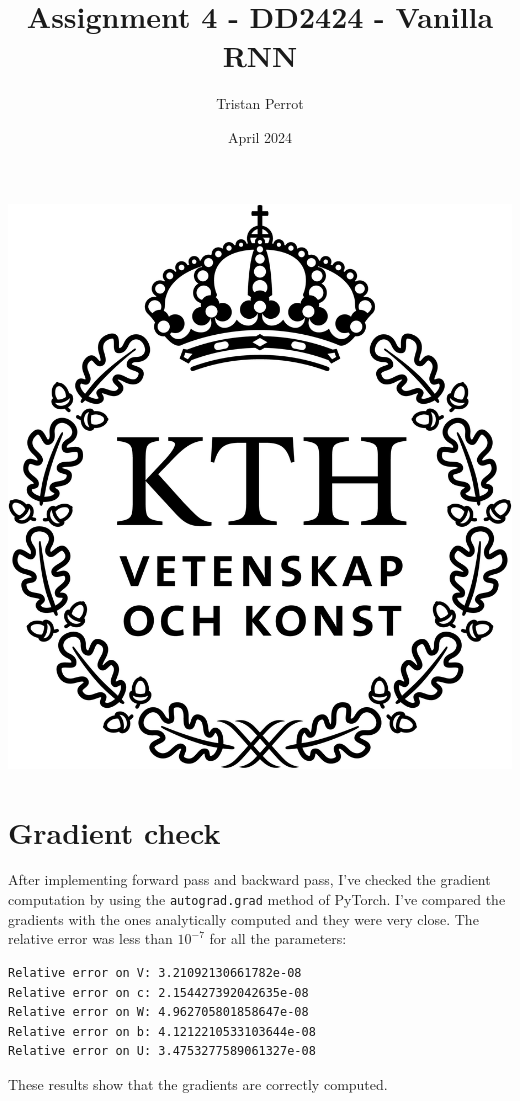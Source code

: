 \documentclass{article}
\title{Assignment 4 - DD2424 - Vanilla RNN}
\author{Tristan Perrot}
\date{April 2024}
\begin{document}
\maketitle
\begin{center}
    \includegraphics[scale=0.25]{images/KTH_logo_RGB_svart.png}
\end{center}

\section*{Gradient check}

After implementing forward pass and backward pass, I've checked the gradient computation by using the \texttt{autograd.grad} method of PyTorch. I've compared the gradients with the ones analytically computed and they were very close. The relative error was less than $10^{-7}$ for all the parameters:
\begin{verbatim}
Relative error on V: 3.21092130661782e-08
Relative error on c: 2.154427392042635e-08
Relative error on W: 4.962705801858647e-08
Relative error on b: 4.1212210533103644e-08
Relative error on U: 3.4753277589061327e-08
\end{verbatim}
These results show that the gradients are correctly computed.
\end{document}
